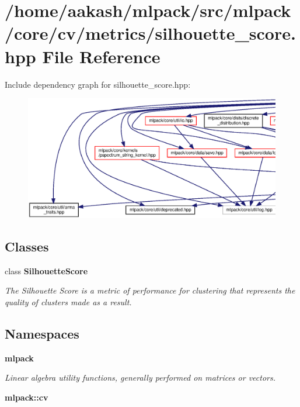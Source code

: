 \section{/home/aakash/mlpack/src/mlpack/core/cv/metrics/silhouette\+\_\+score.hpp File Reference}
\label{silhouette__score_8hpp}
Include dependency graph for silhouette\+\_\+score.\+hpp\+:
\nopagebreak
\begin{figure}[H]
\begin{center}
\leavevmode
\includegraphics[width=350pt]{silhouette__score_8hpp__incl}
\end{center}
\end{figure}
\subsection*{Classes}
\begin{DoxyCompactItemize}
\item 
class \textbf{ Silhouette\+Score}
\begin{DoxyCompactList}\small\item\em The Silhouette Score is a metric of performance for clustering that represents the quality of clusters made as a result. \end{DoxyCompactList}\end{DoxyCompactItemize}
\subsection*{Namespaces}
\begin{DoxyCompactItemize}
\item 
 \textbf{ mlpack}
\begin{DoxyCompactList}\small\item\em Linear algebra utility functions, generally performed on matrices or vectors. \end{DoxyCompactList}\item 
 \textbf{ mlpack\+::cv}
\end{DoxyCompactItemize}


